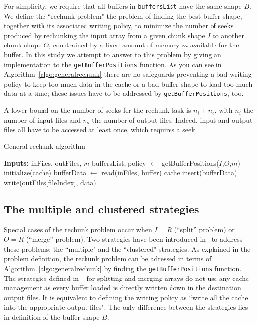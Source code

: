 \documentclass[conference]{IEEEtran}
\begin{document}
For simplicity, we require that all buffers in \texttt{buffersList} have
the same shape $B$. We define the ``rechunk problem" the problem of finding the
best buffer shape, together with its associated writing policy, to minimize the
number of seeks produced by rechunking the input array from a given chunk shape
$I$ to another chunk shape $O$, constrained by a fixed amount of memory $m$
available for the buffer. In this study we attempt to answer to this problem by
giving an implementation to the \texttt{getBufferPositions} function.
As you can see in Algorithm~\ref{algo:generalrechunk} there
are no safeguards preventing a bad writing policy to keep too much data in the
cache or a bad buffer shape to load too much data at a time; these issues have
to be addressed by \texttt{getBufferPositions}, too.

A lower bound on the number of seeks for the rechunk task is
$n_i + n_o$, with $n_i$ the number of input files and $n_o$ the number of output
files. Indeed, input and output files all have to be accessed at least once,
which requires a seek.

\begin{algorithm}
  \caption{General rechunk algorithm}
  \label{algo:generalrechunk}
  \begin{algorithmic}[1]
    \STATE \textbf{Inputs:} inFiles, outFiles, $m$
    \STATE buffersList, policy $\leftarrow$ getBufferPositions($I$,$O$,$m$)
    \STATE initialize(cache)
      \STATE bufferData $\leftarrow$ read(inFiles, buffer)
      \STATE cache.insert(bufferData)
        \STATE write(outFiles[fileIndex], data)
      \ENDFOR
    \ENDFOR

  \end{algorithmic}
\end{algorithm}

\subsection{The multiple and clustered strategies}
Special cases of the rechunk problem occur when $I=R$ (``split'' problem)
or $O=R$ (``merge'' problem). Two strategies have been introduced
in~\cite{seqalgorithms} to address these problems: the ``multiple" and the
``clustered" strategies. As explained in the problem definition, the rechunk
problem can be adressed in terms of Algorithm~\ref{algo:generalrechunk}
by finding the \texttt{getBufferPositions} function.
The strategies defined in ~\cite{seqalgorithms} for splitting and merging arrays
do not use any cache management as every buffer loaded is directly written down
in the destination output files. It is equivalent to defining the writing policy
as ``write all the cache into the appropriate output files". The only difference
between the strategies lies in definition of the buffer shape $B$.
\end{document}
